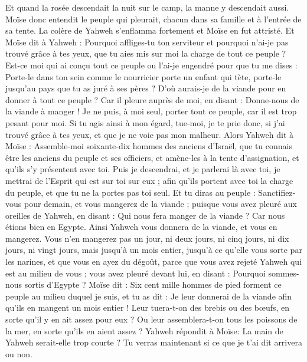 \begin{multicols}{2}
Et quand la rosée descendait la nuit sur le camp, la manne y descendait aussi.
Moïse donc entendit le peuple qui pleurait, chacun dans sa famille et à l'entrée de sa tente. La colère de Yahweh s'enflamma fortement et Moïse en fut attristé.
Et Moïse dit à Yahweh : Pourquoi affliges-tu ton serviteur et pourquoi n'ai-je pas trouvé grâce à tes yeux, que tu aies mis sur moi la charge de tout ce peuple ?
Est-ce moi qui ai conçu tout ce peuple ou l'ai-je engendré pour que tu me dises : Porte-le dans ton sein comme le nourricier porte un enfant qui tète, porte-le jusqu'au pays que tu as juré à ses pères ?
D'où aurais-je de la viande pour en donner à tout ce peuple ? Car il pleure auprès de moi, en disant : Donne-nous de la viande à manger !
Je ne puis, à moi seul, porter tout ce peuple, car il est trop pesant pour moi.
Si tu agis ainsi à mon égard, tue-moi, je te prie donc, si j'ai trouvé grâce à tes yeux, et que je ne voie pas mon malheur.
Alors Yahweh dit à Moïse : Assemble-moi soixante-dix hommes des anciens d'Israël, que tu connais être les anciens du peuple et ses officiers, et amène-les à la tente d'assignation, et qu'ils s'y présentent avec toi.
Puis je descendrai, et je parlerai là avec toi, je mettrai de l'Esprit qui est sur toi sur eux ; afin qu'ils portent avec toi la charge du peuple, et que tu ne la portes pas toi seul.
Et tu diras au peuple : Sanctifiez-vous pour demain, et vous mangerez de la viande ; puisque vous avez pleuré aux oreilles de Yahweh, en disant : Qui nous fera manger de la viande ? Car nous étions bien en Egypte. Ainsi Yahweh vous donnera de la viande, et vous en mangerez.
Vous n'en mangerez pas un jour, ni deux jours, ni cinq jours, ni dix jours, ni vingt jours,
mais jusqu'à un mois entier, jusqu'à ce qu'elle vous sorte par les narines, et que vous en ayez du dégoût, parce que vous avez rejeté Yahweh qui est au milieu de vous ; vous avez pleuré devant lui, en disant : Pourquoi sommes-nous sortis d'Egypte ?
Moïse dit : Six cent mille hommes de pied forment ce peuple au milieu duquel je suis, et tu as dit : Je leur donnerai de la viande afin qu'ils en mangent un mois entier !
Leur tuera-t-on des brebis ou des bœufs, en sorte qu'il y en ait assez pour eux ? Ou leur assemblera-t-on tous les poissons de la mer, en sorte qu'ils en aient assez ?
Yahweh répondit à Moïse: La main de Yahweh serait-elle trop courte ? Tu verras maintenant si ce que je t'ai dit arrivera ou non.

\end{multicols}
